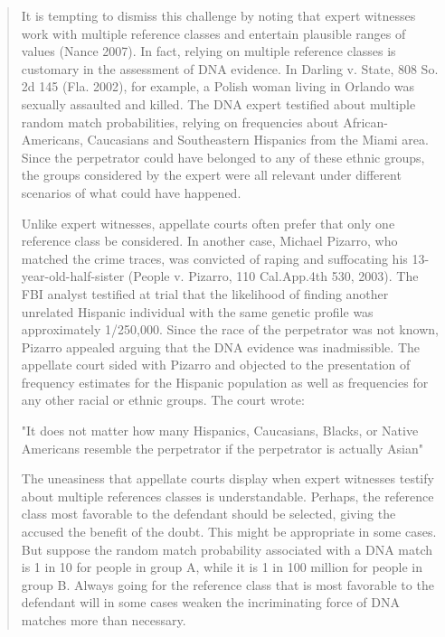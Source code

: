 \documentclass[
  10pt,
  dvipsnames,enabledeprecatedfontcommands]{scrartcl}
\begin{document}
\begin{quote}
It is tempting to dismiss this challenge by noting that expert witnesses work with multiple reference classes and entertain plausible ranges of values (Nance 2007). In fact, relying on multiple reference classes is customary in the assessment of DNA evidence. In Darling v. State, 808 So. 2d 145 (Fla. 2002), for example, a Polish woman living in Orlando was sexually assaulted and killed. The DNA expert testified about multiple random match probabilities, relying on frequencies about African-Americans, Caucasians and Southeastern Hispanics from the Miami area. Since the perpetrator could have belonged to any of these ethnic groups, the groups considered by the expert were all relevant under different scenarios of what could have happened.

Unlike expert witnesses, appellate courts often prefer that only one reference class be considered. In another case, Michael Pizarro, who matched the crime traces, was convicted of raping and suffocating his 13-year-old-half-sister (People v. Pizarro, 110 Cal.App.4th 530, 2003). The FBI analyst testified at trial that the likelihood of finding another unrelated Hispanic individual with the same genetic profile was approximately  1/250,000. Since the race of the perpetrator was not known, Pizarro appealed arguing that the DNA evidence was inadmissible. The appellate court sided with Pizarro and objected to the presentation of frequency estimates for the Hispanic population as well as frequencies for any other racial or ethnic groups. The court wrote:

"It does not matter how many Hispanics, Caucasians, Blacks, or Native Americans resemble the perpetrator if the perpetrator is actually Asian"

The uneasiness that appellate courts display when expert witnesses testify about multiple references classes is understandable. Perhaps, the reference class most favorable to the defendant should be selected, giving the accused the benefit of the doubt. This might be appropriate in some cases. But suppose the random match probability associated with a DNA match is 1 in 10 for people in group A, while it is 1 in 100 million for people in group B. Always going for the reference class that is most favorable to the defendant will in some cases weaken the incriminating force of DNA matches more than necessary.
\end{quote}

\end{document}
